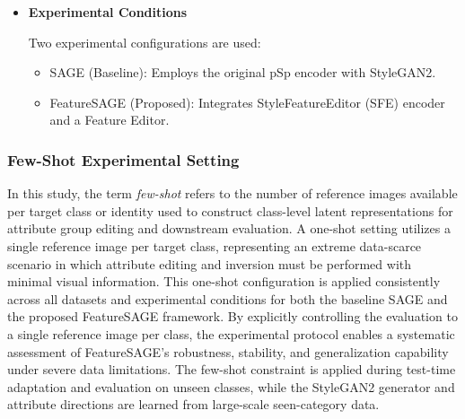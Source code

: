 \begin{itemize}
    \item \textbf{Experimental Conditions}

    Two experimental configurations are used:
    \begin{itemize}
        \item SAGE (Baseline): Employs the original pSp encoder with StyleGAN2.
        \item FeatureSAGE (Proposed): Integrates StyleFeatureEditor (SFE) encoder and a Feature Editor.
    \end{itemize}
\end{itemize}

\subsubsection{Few-Shot Experimental Setting}

In this study, the term \emph{few-shot} refers to the number of reference images available per target class or identity used to construct class-level latent representations for attribute group editing and downstream evaluation. A one-shot setting utilizes a single reference image per target class, representing an extreme data-scarce scenario in which attribute editing and inversion must be performed with minimal visual information. This one-shot configuration is applied consistently across all datasets and experimental conditions for both the baseline SAGE and the proposed FeatureSAGE framework. By explicitly controlling the evaluation to a single reference image per class, the experimental protocol enables a systematic assessment of FeatureSAGE's robustness, stability, and generalization capability under severe data limitations. The few-shot constraint is applied during test-time adaptation and evaluation on unseen classes, while the StyleGAN2 generator and attribute directions are learned from large-scale seen-category data.
